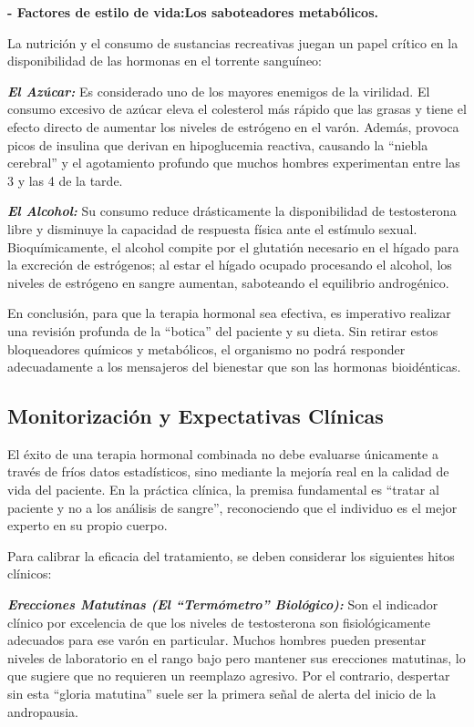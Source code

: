 \documentclass[
  spanish,
]{article}
\begin{document}
\textbf{- Factores de estilo de vida:Los saboteadores metabólicos.}

La nutrición y el consumo de sustancias recreativas juegan un papel crítico en la disponibilidad de las hormonas en el torrente sanguíneo:

\textbf{\emph{El Azúcar:}} Es considerado uno de los mayores enemigos de la virilidad. El consumo excesivo de azúcar eleva el colesterol más rápido que las grasas y tiene el efecto directo de aumentar los niveles de estrógeno en el varón. Además, provoca picos de insulina que derivan en hipoglucemia reactiva, causando la ``niebla cerebral'' y el agotamiento profundo que muchos hombres experimentan entre las 3 y las 4 de la tarde.

\textbf{\emph{El Alcohol:}} Su consumo reduce drásticamente la disponibilidad de testosterona libre y disminuye la capacidad de respuesta física ante el estímulo sexual. Bioquímicamente, el alcohol compite por el glutatión necesario en el hígado para la excreción de estrógenos; al estar el hígado ocupado procesando el alcohol, los niveles de estrógeno en sangre aumentan, saboteando el equilibrio androgénico.

En conclusión, para que la terapia hormonal sea efectiva, es imperativo realizar una revisión profunda de la ``botica'' del paciente y su dieta. Sin retirar estos bloqueadores químicos y metabólicos, el organismo no podrá responder adecuadamente a los mensajeros del bienestar que son las hormonas bioidénticas.

\subsection{Monitorización y Expectativas Clínicas}\label{monitorizaciuxf3n-y-expectativas-cluxednicas}

El éxito de una terapia hormonal combinada no debe evaluarse únicamente a través de fríos datos estadísticos, sino mediante la mejoría real en la calidad de vida del paciente. En la práctica clínica, la premisa fundamental es ``tratar al paciente y no a los análisis de sangre'', reconociendo que el individuo es el mejor experto en su propio cuerpo.

Para calibrar la eficacia del tratamiento, se deben considerar los siguientes hitos clínicos:

\textbf{\emph{Erecciones Matutinas (El ``Termómetro'' Biológico):}}
Son el indicador clínico por excelencia de que los niveles de testosterona son fisiológicamente adecuados para ese varón en particular. Muchos hombres pueden presentar niveles de laboratorio en el rango bajo pero mantener sus erecciones matutinas, lo que sugiere que no requieren un reemplazo agresivo. Por el contrario, despertar sin esta ``gloria matutina'' suele ser la primera señal de alerta del inicio de la andropausia.
\end{document}
